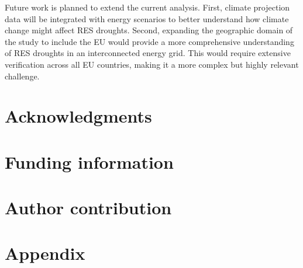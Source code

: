 \documentclass[a4paper, 11pt]{article}
\begin{document}
Future work is planned to extend the current analysis. First, climate projection data will be integrated with energy scenarios to better understand how climate change might affect RES droughts. Second, expanding the geographic domain of the study to include the EU would provide a more comprehensive understanding of RES droughts in an interconnected energy grid. This would require extensive verification across all EU countries, making it a more complex but highly relevant challenge.

\newpage
\section{Acknowledgments}

\section{Funding information}

\section{Author contribution}



\newpage
\section*{Appendix}
\end{document}
